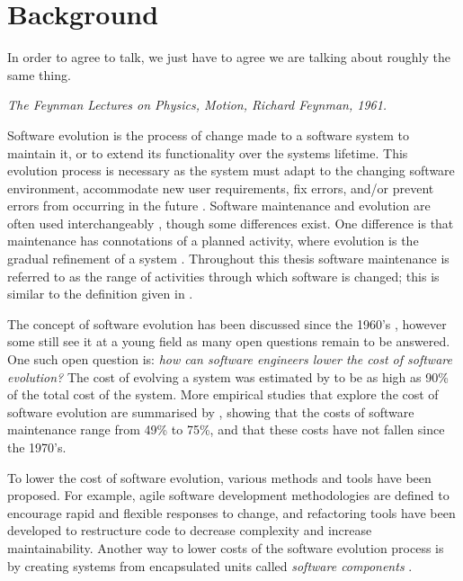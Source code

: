 \chapter{Background}
\label{background}
\epigraph{
In order to agree to talk, we just have to agree we are talking about roughly the same thing.
}
{\textit{The Feynman Lectures on Physics, Motion, Richard Feynman, 1961.}}

Software evolution \citep{lehman1980} is the process of change made to a software system to maintain it, or to extend its functionality over the systems lifetime.
This evolution process is necessary as the system must adapt to the changing software environment, accommodate new user requirements, 
fix errors, and/or prevent errors from occurring in the future \citep{IsoIec2006}.
Software maintenance and evolution are often used interchangeably \citep{Godfrey2008}, though some differences exist.
One difference is that maintenance has connotations of a planned activity, where evolution is the gradual refinement of a system \citep{lehman1980}.
Throughout this thesis software maintenance is referred to as the range of activities through which software is changed; this is similar to the definition given in \citep{lehman1980}.

The concept of software evolution has been discussed since the 1960's \citep{Lehman1969}, 
however some still see it at a young field \citep{Godfrey2008} as many open questions remain to be answered.
One such open question is: \textit{how can software engineers lower the cost of software evolution?}
The cost of evolving a system was estimated by \cite{Brooks1975} to be as high as 90\% of the total cost of the system.
More empirical studies that explore the cost of software evolution are summarised by \cite{Grubb2003}, showing that the costs of software maintenance range from 49\% to 75\%, 
and that these costs have not fallen since the 1970's. 

To lower the cost of software evolution, various methods and tools have been proposed.
For example, agile software development methodologies \citep{beck2001manifesto} are defined to encourage rapid and flexible responses to change,
and refactoring tools \citep{fowler1999refactoring} have been developed to restructure code to decrease complexity and increase maintainability. 
Another way to lower costs of the software evolution process is by creating systems from encapsulated units called \textit{software components} \citep{Szyperski2002}.

